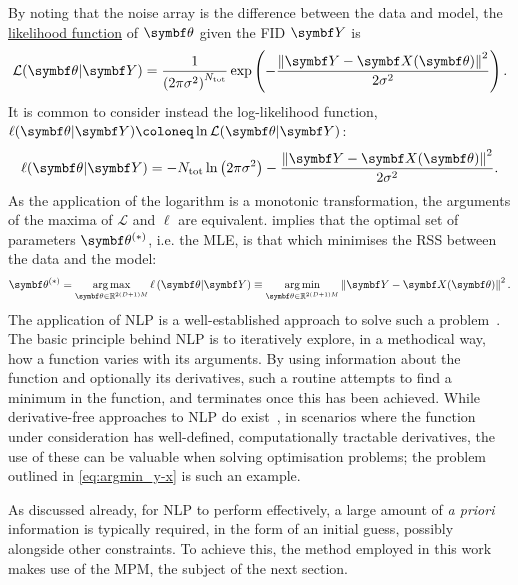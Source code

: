 By noting that the noise array is the difference between the data and model,
the \ul{likelihood function} of $\bth$ given the \ac{FID} $\bY$ is
\begin{equation}
    \mathcal{L}(\bth \vert \bY) =
        \frac{1}{\left(2\pi \sigma^2\right)^{N_{\text{tot}}}}
        \exp\left( -\frac{\left\lVert \bY - \bX(\bth) \right\rVert^2}{2\sigma^2}\right).
\end{equation}
It is common to consider instead the log-likelihood function,
$\ell(\bth \vert \bY) \coloneq \ln \mathcal{L}(\bth \vert
\bY)$:
\begin{equation}
\ell(\bth \vert \bY) =
-N_{\text{tot}} \ln\left(2 \pi \sigma^2\right)
-\frac{\left\lVert \bY - \bX(\bth) \right\rVert^2}{2\sigma^2}.
\label{eq:log-likeihood}
\end{equation}
As the application of the logarithm is a monotonic transformation, the
arguments of the maxima of $\mathcal{L}$ and $\ell$ are equivalent.
 implies that the optimal set of parameters
$\bth^{(*)}$, i.e. the \ac{MLE},
is that which minimises the \ac{RSS} between the data and the model:
\begin{equation}
\bthstar = \argmax_{\bth \in \mathbb{R}^{2(D+1)M}}
\ell\left(\bth \vert \bY\right) \equiv
\argmin_{\bth \in \mathbb{R}^{2(D+1)M}} \left\lVert \bY - \bX(\bth) \right\rVert^2.
\label{eq:argmin_y-x}
\end{equation}
The application of \ac{NLP} is a well-established approach to solve such a
problem~\cite{Nocedal2006,Fletcher1987}. The basic principle behind \ac{NLP} is
to iteratively explore, in a methodical way, how a function varies with its
arguments. By using information about the function and optionally its
derivatives, such a routine attempts to find a minimum in the function, and
terminates once this has been achieved. While derivative-free approaches to
\ac{NLP} do exist~\cite{Nelder1965,Kirkpatrick1983,Powell2009},
in scenarios where the function under consideration has well-defined,
computationally tractable derivatives, the use of these can be valuable when
solving optimisation problems; the problem outlined in
\cref{eq:argmin_y-x} is such an example.

As discussed already, for \ac{NLP} to perform effectively, a large amount of
\textit{a priori} information is typically required, in the form of an initial
guess, possibly alongside other constraints. To achieve this, the method
employed in this work makes use of the \ac{MPM}, the subject of the next
section.

